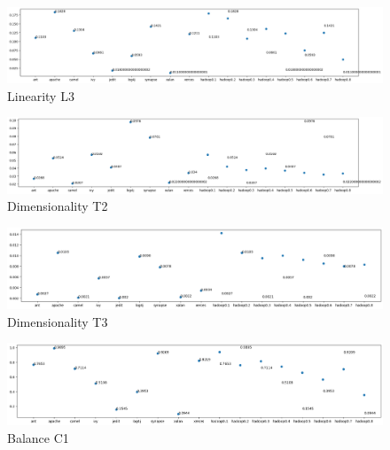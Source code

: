 \begin{figure}[h!]
    \includegraphics[width=\textwidth]{figures/linearity-L3.png}
    \caption{Linearity L3}
    \label{fig:linearity-l3-big}
\end{figure}


\begin{figure}[h!]
    \includegraphics[width=\textwidth]{figures/dimensionality-T2.png}
    \caption{Dimensionality T2}
    \label{fig:dimensionality-t2-big}
\end{figure}

\begin{figure}[h!]
    \includegraphics[width=\textwidth]{figures/dimensionality-T3.png}
    \caption{Dimensionality T3}
    \label{fig:dimensionality-t3-big}
\end{figure}


\begin{figure}[h!]
    \centering
    \includegraphics[width=\linewidth]{figures/balance-C1.png}
    \caption{Balance C1}
    \label{fig:balance-c1-big}
\end{figure}

